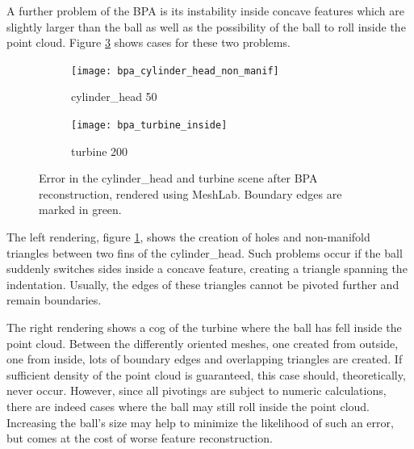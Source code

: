 A further problem of the BPA is its instability inside concave features which are slightly larger than the ball as well as the possibility of the ball to roll inside the point cloud.
Figure \ref{fig:bpa_issues} shows cases for these two problems.
%
\begin{figure}
	\centering
	\begin{subfigure}[b]{0.49\textwidth}
		\centering
		\texttt{[image: bpa\_cylinder\_head\_non\_manif]}
		\caption{cylinder\_head 50}
		\label{fig:bpa_cylinder_head_non_manif}
	\end{subfigure}
	\begin{subfigure}[b]{0.49\textwidth}
		\centering
		\texttt{[image: bpa\_turbine\_inside]}
		\caption{turbine 200}
		\label{fig:bpa_turbine_inside}
	\end{subfigure}
	\caption{
		Error in the cylinder\_head and turbine scene after BPA reconstruction, rendered using MeshLab.
		Boundary edges are marked in green.
	}
	\label{fig:bpa_issues}
\end{figure}

The left rendering, figure \ref{fig:bpa_cylinder_head_non_manif}, shows the creation of holes and non-manifold triangles between two fins of the cylinder\_head.
Such problems occur if the ball suddenly switches sides inside a concave feature, creating a triangle spanning the indentation.
Usually, the edges of these triangles cannot be pivoted further and remain boundaries.

The right rendering shows a cog of the turbine where the ball has fell inside the point cloud.
Between the differently oriented meshes, one created from outside, one from inside, lots of boundary edges and overlapping triangles are created.
If sufficient density of the point cloud is guaranteed, this case should, theoretically, never occur.
However, since all pivotings are subject to numeric calculations, there are indeed cases where the ball may still roll inside the point cloud.
Increasing the ball's size may help to minimize the likelihood of such an error, but comes at the cost of worse feature reconstruction.

